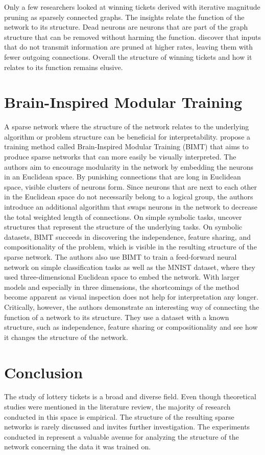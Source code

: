 Only a few researchers looked at winning tickets derived with iterative magnitude pruning as sparsely connected graphs. 
The insights relate the function of the network to its structure.
Dead neurons \autocite{HanEtAl15, AllAlivePruning} are neurons that are part of the graph structure that can be removed without harming the function.
\textcite{LTH} discover that inputs that do not transmit information are pruned at higher rates, leaving them with fewer outgoing connections.
Overall the structure of winning tickets and how it relates to its function remains elusive.

\section{Brain-Inspired Modular Training}
A sparse network where the structure of the network relates to the underlying algorithm or problem structure can be beneficial for interpretability.
\textcite{BIMT} propose a training method called Brain-Inspired Modular Training (BIMT) that aims to produce sparse networks that can more easily be visually interpreted.
The authors aim to encourage modularity in the network by embedding the neurons in an Euclidean space.
By punishing connections that are long in Euclidean space, visible clusters of neurons form. 
Since neurons that are next to each other in the Euclidean space do not necessarily belong to a logical group, the authors introduce an additional algorithm that swaps neurons in the network to decrease the total weighted length of connections.
On simple symbolic tasks, \autocite{BIMT} uncover structures that represent the structure of the underlying tasks.
On symbolic datasets, BIMT succeeds in discovering the independence, feature sharing, and compositionality of the problem, which is visible in the resulting structure of the sparse network.
The authors also use BIMT to train a feed-forward neural network on simple classification tasks as well as the MNIST dataset, where they used three-dimensional Euclidean space to embed the network.
With larger models and especially in three dimensions, the shortcomings of the method become apparent as visual inspection does not help for interpretation any longer.
Critically, however, the authors demonstrate an interesting way of connecting the function of a network to its structure.
They use a dataset with a known structure, such as independence, feature sharing or compositionality and see how it changes the structure of the network.

\section{Conclusion}
The study of lottery tickets is a broad and diverse field. 
Even though theoretical studies were mentioned in the literature review, the majority of research conducted in this space is empirical.
The structure of the resulting sparse networks is rarely discussed and invites further investigation.
The experiments conducted in \autocite{BIMT} represent a valuable avenue for analyzing the structure of the network concerning the data it was trained on.
